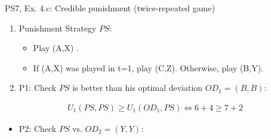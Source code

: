 \begin{frame}{PS7, Ex. 4.c: Credible punishment (twice-repeated game)}
\begin{multicols}{2}
\begin{enumerate}
        \item[b.] Punishment Strategy $PS$:
        \begin{itemize}\normalsize
          \item[t=1:] Play (A,X) .
          \item[t=2:] If (A,X) was played in t=1, play (C,Z). Otherwise, play (B,Y).
        \end{itemize}
        \item[c.] P1: Check $PS$ is better than his optimal deviation $OD_1=(B,B)$:
      \end{enumerate}
      \vspace{-14pt}
      \begin{align*}
          U_1(PS,PS)\geq U_1(OD_1,PS)\Leftrightarrow6+4\geq7+2%
      \end{align*}
      \vspace{-22pt}
      \begin{itemize}
          \item[c.] P2: Check $PS$ vs. $OD_2=(Y,Y)$:
      \end{itemize}
      \vfill\null
    \end{multicols}
\end{frame}
